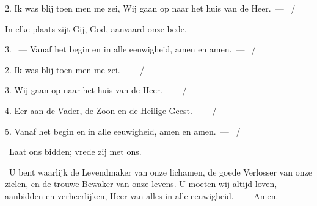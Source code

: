 \documentclass[12pt,twoside,a5paper]{article}
\begin{document}
\begin{halfparskip}
  2. Ik was blij toen men me zei, Wij gaan op naar het huis van de Heer.~--- ~/ 

  \liturgicallbracket{} In elke plaats zijt Gij, God, aanvaard onze bede.\liturgicalrbracket

  3. ~--- Vanaf het begin en in alle eeuwigheid, amen en amen.~--- ~/ 

   2. Ik was blij toen men me zei.~--- ~/ 

  3. Wij gaan op naar het huis van de Heer.~--- ~/ 

  4. Eer aan de Vader, de Zoon en de Heilige Geest.~--- ~/ 

  5. Vanaf het begin en in alle eeuwigheid, amen en amen.~--- ~/ 

  \dd~Laat ons bidden; vrede zij met ons.

  \cc~U bent waarlijk de Levendmaker van onze lichamen, de goede Verlosser van onze zielen, en de trouwe Bewaker van onze levens. U moeten wij altijd loven, aanbidden en verheerlijken, Heer van alles in alle eeuwigheid.~--- \rr~Amen.
\end{halfparskip}





 
\end{document}
